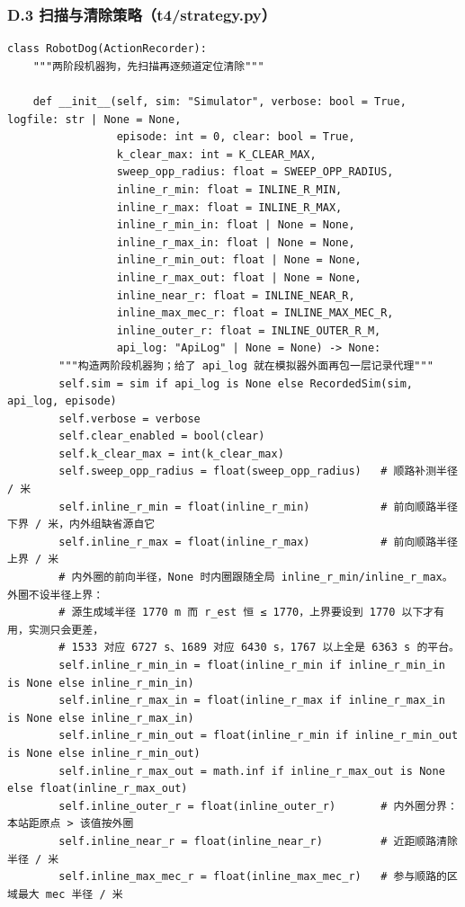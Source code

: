 \documentclass[UTF8, zihao=5,AutoFakeBold=2]{ctexart}
\begin{document}
	\subsubsection*{D.3 \quad 扫描与清除策略（t4/strategy.py）}
	\begin{lstlisting}
class RobotDog(ActionRecorder):
    """两阶段机器狗，先扫描再逐频道定位清除"""

    def __init__(self, sim: "Simulator", verbose: bool = True, logfile: str | None = None,
                 episode: int = 0, clear: bool = True,
                 k_clear_max: int = K_CLEAR_MAX,
                 sweep_opp_radius: float = SWEEP_OPP_RADIUS,
                 inline_r_min: float = INLINE_R_MIN,
                 inline_r_max: float = INLINE_R_MAX,
                 inline_r_min_in: float | None = None,
                 inline_r_max_in: float | None = None,
                 inline_r_min_out: float | None = None,
                 inline_r_max_out: float | None = None,
                 inline_near_r: float = INLINE_NEAR_R,
                 inline_max_mec_r: float = INLINE_MAX_MEC_R,
                 inline_outer_r: float = INLINE_OUTER_R_M,
                 api_log: "ApiLog" | None = None) -> None:
        """构造两阶段机器狗；给了 api_log 就在模拟器外面再包一层记录代理"""
        self.sim = sim if api_log is None else RecordedSim(sim, api_log, episode)
        self.verbose = verbose
        self.clear_enabled = bool(clear)
        self.k_clear_max = int(k_clear_max)
        self.sweep_opp_radius = float(sweep_opp_radius)   # 顺路补测半径 / 米
        self.inline_r_min = float(inline_r_min)           # 前向顺路半径下界 / 米，内外组缺省源自它
        self.inline_r_max = float(inline_r_max)           # 前向顺路半径上界 / 米
        # 内外圈的前向半径，None 时内圈跟随全局 inline_r_min/inline_r_max。外圈不设半径上界：
        # 源生成域半径 1770 m 而 r_est 恒 ≤ 1770，上界要设到 1770 以下才有用，实测只会更差，
        # 1533 对应 6727 s、1689 对应 6430 s，1767 以上全是 6363 s 的平台。
        self.inline_r_min_in = float(inline_r_min if inline_r_min_in is None else inline_r_min_in)
        self.inline_r_max_in = float(inline_r_max if inline_r_max_in is None else inline_r_max_in)
        self.inline_r_min_out = float(inline_r_min if inline_r_min_out is None else inline_r_min_out)
        self.inline_r_max_out = math.inf if inline_r_max_out is None else float(inline_r_max_out)
        self.inline_outer_r = float(inline_outer_r)       # 内外圈分界：本站距原点 > 该值按外圈
        self.inline_near_r = float(inline_near_r)         # 近距顺路清除半径 / 米
        self.inline_max_mec_r = float(inline_max_mec_r)   # 参与顺路的区域最大 mec 半径 / 米

\end{lstlisting}
\end{document}
